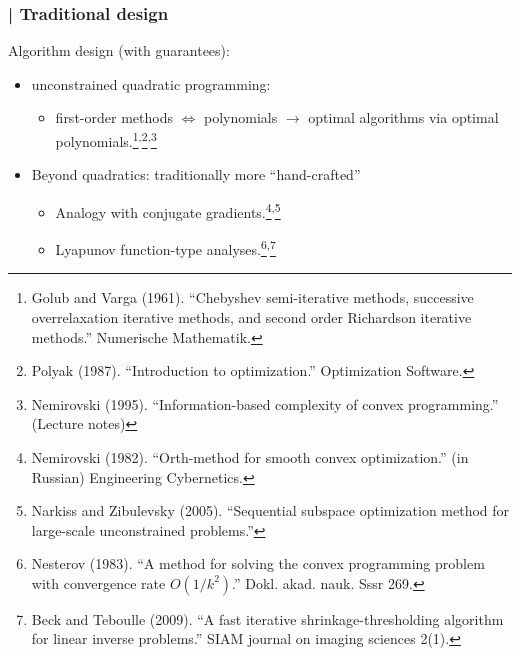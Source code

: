 \documentclass[aspectratio=169]{beamer}
\newcommand{\titleB}[1]{{}|\! #1}
\newcommand{\frtitle}[1]{\frametitle{\titleB{#1}}}
\begin{document}
\begin{frame}\frtitle{Traditional design}\small\vspace{.3cm}

	Algorithm design (with guarantees):	
	\begin{itemize}
		\item<2-> unconstrained quadratic programming:
			\begin{itemize}
				\item[] first-order methods $\Leftrightarrow$ polynomials $\rightarrow$ optimal algorithms via optimal polynomials.\footnote<2->{Golub and Varga (1961). ``Chebyshev semi-iterative methods, successive
overrelaxation iterative methods, and second order Richardson iterative methods.'' Numerische Mathematik.}\textsuperscript{,}\footnote<2->{Polyak (1987). ``Introduction to optimization.'' Optimization Software.}\textsuperscript{,}\footnote<2->{Nemirovski (1995). ``Information-based complexity of convex programming.'' (Lecture notes)}
			\end{itemize}
		\item<3-> Beyond quadratics: traditionally more ``hand-crafted''
		\begin{itemize}
			\item Analogy with conjugate gradients.\footnote<3->{Nemirovski (1982). ``Orth-method for smooth convex optimization.'' (in Russian) Engineering Cybernetics.}\textsuperscript{,}\footnote<3->{Narkiss and Zibulevsky (2005). ``Sequential subspace optimization method for large-scale unconstrained problems.''}
			\item Lyapunov function-type analyses.\footnote<3->{Nesterov (1983). ``A method for solving the convex programming problem with convergence rate $O(1/k^2)$.'' Dokl. akad. nauk. Sssr 269.}\textsuperscript{,}\footnote<3->{Beck and Teboulle (2009). ``A fast iterative shrinkage-thresholding algorithm for linear inverse problems.'' SIAM journal on imaging sciences 2(1).
}
		\end{itemize}
	\end{itemize}
\end{frame}
\end{document}

